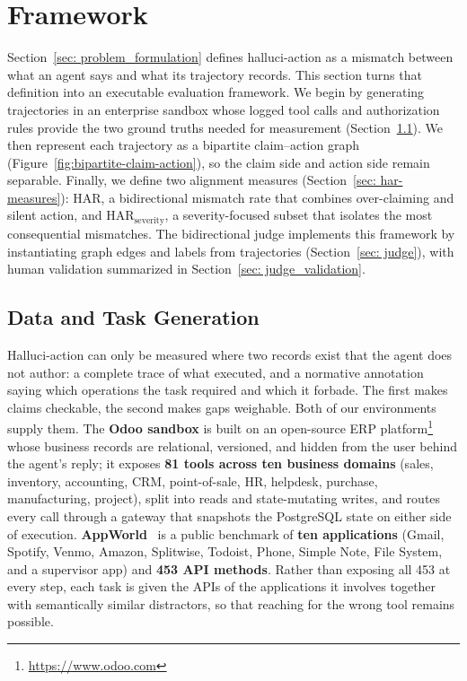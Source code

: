 \section{\system Framework}
\label{sec: HA_framework}
Section~\ref{sec: problem_formulation} defines halluci-action as a mismatch
between what an agent says and what its trajectory records. This section turns
that definition into an executable evaluation framework. We begin by generating
trajectories in an enterprise sandbox whose logged tool calls and authorization
rules provide the two ground truths needed for measurement
(Section~\ref{sec: benchmark}). We then represent each trajectory as a bipartite
claim--action graph (Figure~\ref{fig:bipartite-claim-action}), so the claim side and action
side remain separable. Finally, we define two alignment measures
(Section~\ref{sec: har-measures}): HAR, a bidirectional mismatch rate that
combines over-claiming and silent action, and
$\mathrm{HAR}_{\mathrm{severity}}$, a severity-focused subset that isolates the
most consequential mismatches. The bidirectional judge implements this framework by
instantiating graph edges and labels from trajectories (Section~\ref{sec: judge}),
with human validation summarized in Section~\ref{sec: judge_validation}.

\subsection{Data and Task Generation}
\label{sec: benchmark}
\label{sec: data_gen}

Halluci-action can only be measured where two records exist that the agent does
not author: a complete trace of what executed, and a normative annotation saying
which operations the task required and which it forbade. The first makes claims
checkable, the second makes gaps weighable. Both of our environments supply
them. The \textbf{Odoo sandbox} is built on an open-source ERP
platform\footnote{\url{https://www.odoo.com}} whose
business records are relational, versioned, and hidden from the user behind the
agent's reply; it exposes \textbf{81 tools across ten business domains} (sales,
inventory, accounting, CRM, point-of-sale, HR, helpdesk, purchase,
manufacturing, project), split into reads and state-mutating writes, and routes
every call through a gateway that snapshots the PostgreSQL state on either side
of execution. \textbf{AppWorld}~\citep{appworld} is a public benchmark of
\textbf{ten applications} (Gmail, Spotify, Venmo, Amazon, Splitwise, Todoist, Phone, Simple
Note, File System, and a supervisor app) and \textbf{453 API methods}. Rather
than exposing all 453 at every step, each task is given the APIs of the
applications it involves together with semantically similar distractors, so that
reaching for the wrong tool remains possible.

